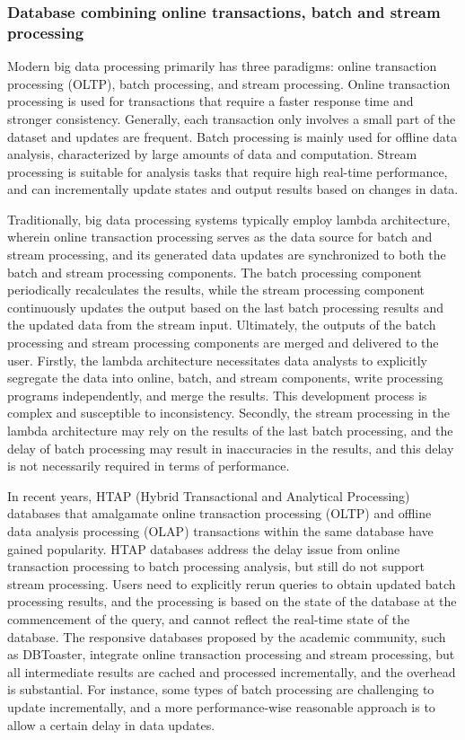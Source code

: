 \subsubsection{Database combining online transactions, batch and stream processing}
\label{future:reactdb}

Modern big data processing primarily has three paradigms: online transaction processing (OLTP), batch processing, and stream processing. Online transaction processing is used for transactions that require a faster response time and stronger consistency. Generally, each transaction only involves a small part of the dataset and updates are frequent. Batch processing is mainly used for offline data analysis, characterized by large amounts of data and computation. Stream processing is suitable for analysis tasks that require high real-time performance, and can incrementally update states and output results based on changes in data.

Traditionally, big data processing systems typically employ lambda architecture, wherein online transaction processing serves as the data source for batch and stream processing, and its generated data updates are synchronized to both the batch and stream processing components. The batch processing component periodically recalculates the results, while the stream processing component continuously updates the output based on the last batch processing results and the updated data from the stream input. Ultimately, the outputs of the batch processing and stream processing components are merged and delivered to the user. Firstly, the lambda architecture necessitates data analysts to explicitly segregate the data into online, batch, and stream components, write processing programs independently, and merge the results. This development process is complex and susceptible to inconsistency. Secondly, the stream processing in the lambda architecture may rely on the results of the last batch processing, and the delay of batch processing may result in inaccuracies in the results, and this delay is not necessarily required in terms of performance.

In recent years, HTAP (Hybrid Transactional and Analytical Processing) databases that amalgamate online transaction processing (OLTP) and offline data analysis processing (OLAP) transactions within the same database have gained popularity. HTAP databases address the delay issue from online transaction processing to batch processing analysis, but still do not support stream processing. Users need to explicitly rerun queries to obtain updated batch processing results, and the processing is based on the state of the database at the commencement of the query, and cannot reflect the real-time state of the database. The responsive databases proposed by the academic community, such as DBToaster, integrate online transaction processing and stream processing, but all intermediate results are cached and processed incrementally, and the overhead is substantial. For instance, some types of batch processing are challenging to update incrementally, and a more performance-wise reasonable approach is to allow a certain delay in data updates.

